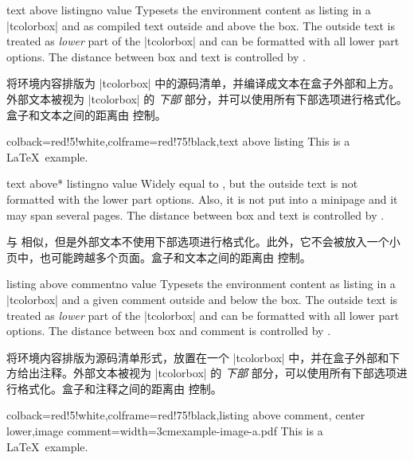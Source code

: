 
\begin{docTcbKey}{text above listing}{}{no value}
Typesets the environment content as listing in a |tcolorbox|
and as compiled text outside and above the box.
The outside text is treated as \emph{lower} part of the
|tcolorbox| and can be formatted with all lower part options.
The distance between box and text is controlled by .

将环境内容排版为 |tcolorbox| 中的源码清单，并编译成文本在盒子外部和上方。外部文本被视为 |tcolorbox| 的 \emph{下部} 部分，并可以使用所有下部选项进行格式化。盒子和文本之间的距离由  控制。
\begin{dispExample}
\begin{tcblisting}{colback=red!5!white,colframe=red!75!black,text above listing}
This is a \LaTeX\ example.
\end{tcblisting}
\end{dispExample}
\end{docTcbKey}


\begin{docTcbKey}[][doc new=2014-11-07]{text above* listing}{}{no value}
Widely equal to , but the outside text is
not formatted with the lower part options.
Also, it is not put into a minipage and it may span several pages.
The distance between box and text is controlled by .

与  相似，但是外部文本不使用下部选项进行格式化。此外，它不会被放入一个小页中，也可能跨越多个页面。盒子和文本之间的距离由  控制。
\end{docTcbKey}



\begin{docTcbKey}{listing above comment}{}{no value}
Typesets the environment content as listing in a |tcolorbox|
and a given comment outside and below the box.
The outside text is treated as \emph{lower} part of the
|tcolorbox| and can be formatted with all lower part options.
The distance between box and comment is controlled by .

将环境内容排版为源码清单形式，放置在一个 |tcolorbox| 中，并在盒子外部和下方给出注释。外部文本被视为 |tcolorbox| 的 \emph{下部} 部分，可以使用所有下部选项进行格式化。盒子和注释之间的距离由  控制。
\begin{dispExample}
\begin{tcblisting}{colback=red!5!white,colframe=red!75!black,listing above comment,
center lower,image comment={width=3cm}{example-image-a.pdf}}
This is a \LaTeX\ example.
\end{tcblisting}
\end{dispExample}
\end{docTcbKey}


